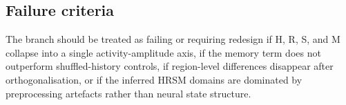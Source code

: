 \subsection{Failure criteria}

The branch should be treated as failing or requiring redesign if H, R, S, and M collapse into a single activity-amplitude axis, if the memory term does not outperform shuffled-history controls, if region-level differences disappear after orthogonalisation, or if the inferred HRSM domains are dominated by preprocessing artefacts rather than neural state structure.
